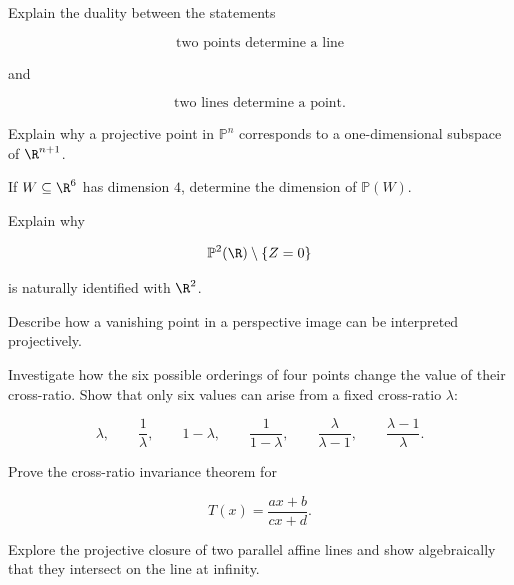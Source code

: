 \begin{exercise}[3]
Explain the duality between the statements

\[
\text{two points determine a line}
\]

and

\[
\text{two lines determine a point}.
\]
\end{exercise}

\begin{exercise}[3]
Explain why a projective point in \(\mathbb{P}^{n}\) corresponds to a
one-dimensional subspace of \(\R^{n+1}\).
\end{exercise}

\begin{exercise}[3]
If \(W\subseteq\R^{6}\) has dimension \(4\), determine the dimension of
\(\mathbb{P}(W)\).
\end{exercise}

\begin{exercise}[3]
Explain why

\[
\mathbb{P}^{2}(\R)\setminus\{Z=0\}
\]

is naturally identified with \(\R^2\).
\end{exercise}

\begin{exercise}[3]
Describe how a vanishing point in a perspective image can be interpreted
projectively.
\end{exercise}

\begin{exercise}[4]
Investigate how the six possible orderings of four points change the value
of their cross-ratio. Show that only six values can arise from a fixed
cross-ratio \(\lambda\):

\[
\lambda,\qquad
\frac1{\lambda},\qquad
1-\lambda,\qquad
\frac1{1-\lambda},\qquad
\frac{\lambda}{\lambda-1},\qquad
\frac{\lambda-1}{\lambda}.
\]
\end{exercise}

\begin{exercise}[4]
Prove the cross-ratio invariance theorem for

\[
T(x)=\frac{ax+b}{cx+d}.
\]
\end{exercise}

\begin{exercise}[4]
Explore the projective closure of two parallel affine lines and show
algebraically that they intersect on the line at infinity.
\end{exercise}


